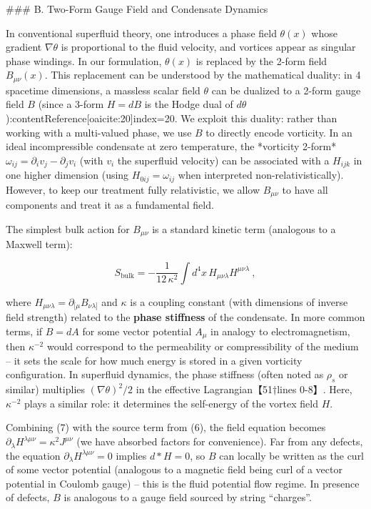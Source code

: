 \documentclass[12pt]{article}
\begin{document}
### B. Two-Form Gauge Field and Condensate Dynamics

In conventional superfluid theory, one introduces a phase field $\theta(x)$ whose gradient $\nabla\theta$ is proportional to the fluid velocity, and vortices appear as singular phase windings. In our formulation, $\theta(x)$ is replaced by the 2-form field $B_{\mu\nu}(x)$. This replacement can be understood by the mathematical duality: in 4 spacetime dimensions, a massless scalar field $\theta$ can be dualized to a 2-form gauge field $B$ (since a 3-form $H=dB$ is the Hodge dual of $d\theta$):contentReference[oaicite:20]{index=20}. We exploit this duality: rather than working with a multi-valued phase, we use $B$ to directly encode vorticity. In an ideal incompressible condensate at zero temperature, the *vorticity 2-form* $\omega_{ij} = \partial_i v_j - \partial_j v_i$ (with $v_i$ the superfluid velocity) can be associated with a $H_{ijk}$ in one higher dimension (using $H_{0ij} = \omega_{ij}$ when interpreted non-relativistically). However, to keep our treatment fully relativistic, we allow $B_{\mu\nu}$ to have all components and treat it as a fundamental field.

The simplest bulk action for $B_{\mu\nu}$ is a standard kinetic term (analogous to a Maxwell term):

\[ S_{\text{bulk}} = -\frac{1}{12\,\kappa^2} \int d^4x\, H_{\mu\nu\lambda} H^{\mu\nu\lambda}~, \tag{7} \] 

where $H_{\mu\nu\lambda}=\partial_{[\mu}B_{\nu\lambda]}$ and $\kappa$ is a coupling constant (with dimensions of inverse field strength) related to the \textbf{phase stiffness} of the condensate. In more common terms, if $B=dA$ for some vector potential $A_\mu$ in analogy to electromagnetism, then $\kappa^{-2}$ would correspond to the permeability or compressibility of the medium – it sets the scale for how much energy is stored in a given vorticity configuration. In superfluid dynamics, the phase stiffness (often noted as $\rho_s$ or similar) multiplies $(\nabla\theta)^2/2$ in the effective Lagrangian【51†lines 0-8】. Here, $\kappa^{-2}$ plays a similar role: it determines the self-energy of the vortex field $H$.

Combining (7) with the source term from (6), the field equation becomes $\partial_\lambda H^{\lambda\mu\nu} = \kappa^2 J^{\mu\nu}$ (we have absorbed factors for convenience). Far from any defects, the equation $\partial_\lambda H^{\lambda\mu\nu}=0$ implies $d*H=0$, so $B$ can locally be written as the curl of some vector potential (analogous to a magnetic field being curl of a vector potential in Coulomb gauge) – this is the fluid potential flow regime. In presence of defects, $B$ is analogous to a gauge field sourced by string “charges”. 
\end{document}
